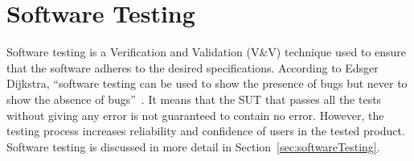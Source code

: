 

\section{Software Testing} 
Software testing is a Verification and Validation (V\&V) technique used to ensure that the software adheres to the desired specifications. According to Edsger Dijkstra, ``software testing can be used to show the presence of bugs but never to show the absence of bugs''~\cite{dahl1972structured}. It means that the SUT that passes all the tests without giving any error is not guaranteed to contain no error. However, the testing process increases reliability and confidence of users in the tested product. Software testing is discussed in more detail in Section~\ref{sec:softwareTesting}.

